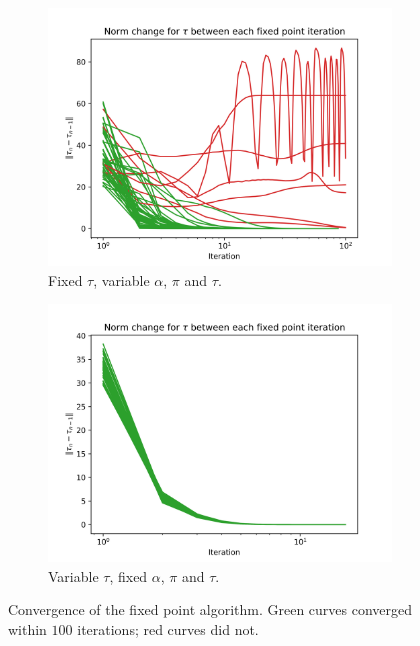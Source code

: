 \documentclass[switch, 12pt]{article}
\begin{document}
\begin{multicols}{2}
    \begin{figure}
        \centering
        \begin{subfigure}{0.49\linewidth}
            \centering
            \includegraphics[width=\linewidth]{figures/fixed_point_convergence_fixed_tau.png}
            \caption{Fixed $\tau$, variable $\alpha$, $\pi$ and $\tau$.}
            \label{fig:fixed_point_cv_tau}
        \end{subfigure}
        \begin{subfigure}{0.49\linewidth}
            \centering
            \includegraphics[width=\linewidth]{figures/fixed_point_convergence_fixed_X_alpha_pi.png}
            \caption{Variable $\tau$, fixed $\alpha$, $\pi$ and $\tau$.}
            \label{fig:fixed_point_cv_X}
        \end{subfigure}
        \caption{Convergence of the fixed point algorithm. Green curves converged within $100$ iterations; red curves did not.}
        \label{fig:fixed_point_cv}
    \end{figure}



\end{multicols}
\end{document}
